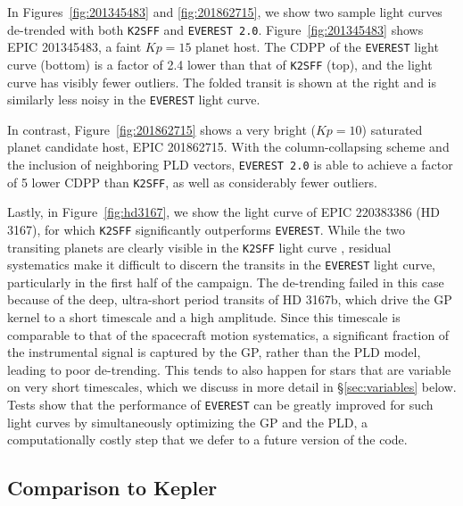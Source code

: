 \documentclass[]{aastex62}
\newcommand{\Kp}{\ensuremath{Kp}}
\newcommand{\edited}[1]{{\color{red} #1}}
\begin{document}
In Figures~\ref{fig:201345483} and \ref{fig:201862715},  we show two sample light curves
de-trended with both \texttt{K2SFF} and \texttt{EVEREST 2.0}. Figure~\ref{fig:201345483}
shows EPIC 201345483, a faint $\Kp = 15$ planet host.
The CDPP of the \texttt{EVEREST} light curve (bottom) is a factor of 2.4 lower than that of
\texttt{K2SFF} (top), and the light curve has visibly fewer outliers. The folded transit
is shown at the right and is similarly less noisy in the \texttt{EVEREST} light curve.

In contrast, Figure~\ref{fig:201862715} shows a very bright ($\Kp = 10$) saturated
planet candidate host, EPIC 201862715. With the column-collapsing scheme and the
inclusion of neighboring PLD vectors, \texttt{EVEREST 2.0} is able to achieve a factor
of 5 lower CDPP than \texttt{K2SFF}, as well as considerably fewer outliers.

\edited{Lastly, in Figure~\ref{fig:hd3167}, we show the light curve of EPIC 220383386 (HD 3167),
for which \texttt{K2SFF} significantly outperforms \texttt{EVEREST}. While the two
transiting planets are clearly visible in the \texttt{K2SFF} light curve
\citep[an ultra-short period planet at a period of 0.96 days and a planet at a period of
29.85 days;][]{Vanderburg16}, residual systematics make it difficult to discern the
transits in the \texttt{EVEREST} light curve, particularly in the first half of the
campaign. The de-trending failed in this case because of the deep, ultra-short period transits
of HD 3167b, which drive the GP kernel to a short timescale and a high amplitude. Since this
timescale is comparable to that of the spacecraft motion systematics, a significant fraction of the
instrumental signal is captured by the GP, rather than the PLD model, leading to poor
de-trending. This tends to also happen for stars that are variable on very short timescales,
which we discuss in more detail in \S\ref{sec:variables} below. Tests show that the performance
of \texttt{EVEREST} can be greatly improved for such light curves by simultaneously optimizing the
GP and the PLD, a computationally costly step that we defer to a future version of the code.}

\subsection{Comparison to Kepler}
\label{sec:kepler}
\end{document}
